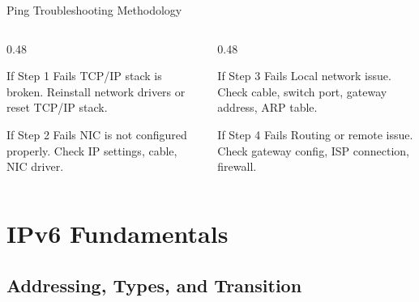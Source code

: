 \documentclass[aspectratio=169]{beamer}  %
\begin{document}
\begin{frame}{Ping Troubleshooting Methodology}
    \vspace{0.5em}
    \begin{columns}[T]
        \begin{column}{0.48\textwidth}
            \begin{block}{If Step 1 Fails}
                \small
                TCP/IP stack is broken. Reinstall network drivers or reset TCP/IP stack.
            \end{block}
            
            \vspace{0.2em}
            \begin{block}{If Step 2 Fails}
                \small
                NIC is not configured properly. Check IP settings, cable, NIC driver.
            \end{block}
        \end{column}
        \begin{column}{0.48\textwidth}
            \begin{block}{If Step 3 Fails}
                \small
                Local network issue. Check cable, switch port, gateway address, ARP table.
            \end{block}
            
            \vspace{0.2em}
            \begin{block}{If Step 4 Fails}
                \small
                Routing or remote issue. Check gateway config, ISP connection, firewall.
            \end{block}
        \end{column}
    \end{columns}
\end{frame}

\section{IPv6 Fundamentals}
\subsection{Addressing, Types, and Transition}

\end{document}
